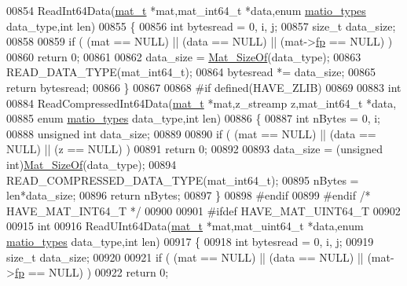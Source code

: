 \begin{DoxyCode}
00854 ReadInt64Data(\hyperlink{struct__mat__t}{mat\_t} *mat,mat\_int64\_t *data,\textcolor{keyword}{enum} \hyperlink{group___m_a_t_gacf7b3b879282b7ab3a51190e49bf3453}{matio\_types} data\_type,\textcolor{keywordtype}{int} len)
00855 \{
00856     \textcolor{keywordtype}{int} bytesread = 0, i, j;
00857     \textcolor{keywordtype}{size\_t} data\_size;
00858 
00859     \textcolor{keywordflow}{if} ( (mat == NULL) || (data == NULL) || (mat->\hyperlink{struct__mat__t_a85f562e407ca9ad4d2a6e14f839432b7}{fp} == NULL) )
00860         \textcolor{keywordflow}{return} 0;
00861 
00862     data\_size = \hyperlink{group__mat__util_gab6774aabdc124c540c1e7686d0804940}{Mat\_SizeOf}(data\_type);
00863     READ\_DATA\_TYPE(mat\_int64\_t);
00864     bytesread *= data\_size;
00865     \textcolor{keywordflow}{return} bytesread;
00866 \}
00867 
00868 \textcolor{preprocessor}{#if defined(HAVE\_ZLIB)}
00869 
00883 \textcolor{keywordtype}{int}
00884 ReadCompressedInt64Data(\hyperlink{struct__mat__t}{mat\_t} *mat,z\_streamp z,mat\_int64\_t *data,
00885     \textcolor{keyword}{enum} \hyperlink{group___m_a_t_gacf7b3b879282b7ab3a51190e49bf3453}{matio\_types} data\_type,\textcolor{keywordtype}{int} len)
00886 \{
00887     \textcolor{keywordtype}{int} nBytes = 0, i;
00888     \textcolor{keywordtype}{unsigned} \textcolor{keywordtype}{int} data\_size;
00889 
00890     \textcolor{keywordflow}{if} ( (mat == NULL) || (data == NULL) || (z == NULL) )
00891         \textcolor{keywordflow}{return} 0;
00892 
00893     data\_size = (\textcolor{keywordtype}{unsigned} int)\hyperlink{group__mat__util_gab6774aabdc124c540c1e7686d0804940}{Mat\_SizeOf}(data\_type);
00894     READ\_COMPRESSED\_DATA\_TYPE(mat\_int64\_t);
00895     nBytes = len*data\_size;
00896     \textcolor{keywordflow}{return} nBytes;
00897 \}
00898 \textcolor{preprocessor}{#endif}
00899 \textcolor{preprocessor}{#endif }\textcolor{comment}{/* HAVE\_MAT\_INT64\_T */}\textcolor{preprocessor}{}
00900 
00901 \textcolor{preprocessor}{#ifdef HAVE\_MAT\_UINT64\_T}
00902 
00915 \textcolor{keywordtype}{int}
00916 ReadUInt64Data(\hyperlink{struct__mat__t}{mat\_t} *mat,mat\_uint64\_t *data,\textcolor{keyword}{enum} \hyperlink{group___m_a_t_gacf7b3b879282b7ab3a51190e49bf3453}{matio\_types} data\_type,\textcolor{keywordtype}{int} len)
00917 \{
00918     \textcolor{keywordtype}{int} bytesread = 0, i, j;
00919     \textcolor{keywordtype}{size\_t} data\_size;
00920 
00921     \textcolor{keywordflow}{if} ( (mat == NULL) || (data == NULL) || (mat->\hyperlink{struct__mat__t_a85f562e407ca9ad4d2a6e14f839432b7}{fp} == NULL) )
00922         \textcolor{keywordflow}{return} 0;

\end{DoxyCode}
